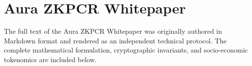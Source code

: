 \documentclass[12pt]{article}
\begin{document}
\chapter*{Aura ZKPCR Whitepaper}

The full text of the Aura ZKPCR Whitepaper was originally authored in Markdown format and rendered as an independent technical protocol. The complete mathematical formulation, cryptographic invariants, and socio-economic tokenomics are included below.




\end{document}
